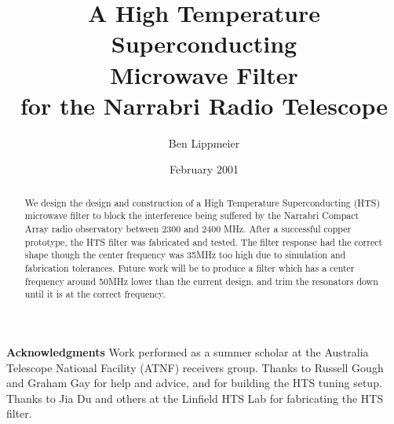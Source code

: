 \documentclass{article}[12pt]
\begin{document}
\title	{A High Temperature Superconducting\\ Microwave Filter \\ for the Narrabri Radio Telescope}
\author	{Ben Lippmeier}
\date	{February 2001}

\maketitle

\begin{abstract}
We design the design and construction of a High Temperature Superconducting (HTS) microwave filter to block the interference being suffered by the Narrabri Compact Array radio observatory between 2300 and 2400 MHz. After a successful copper prototype, the HTS filter was fabricated and tested. The filter response had the correct shape though the center frequency was 35MHz too high due to simulation and fabrication tolerances. Future work will be to produce a filter which has a center frequency around 50MHz lower than the current design, and trim the resonators down until it is at the correct frequency.
\end{abstract}







\medskip
\textbf{Acknowledgments}
Work performed as a summer scholar at the Australia Telescope National Facility (ATNF) receivers group. Thanks to Russell Gough and Graham Gay for help and advice, and for building the HTS tuning setup. Thanks to Jia Du and others at the Linfield HTS Lab for fabricating the HTS filter.

\clearpage{}


\end{document}
